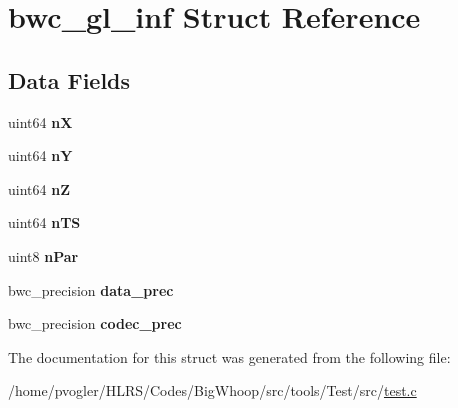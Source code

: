 \hypertarget{structbwc__gl__inf}{}\section{bwc\+\_\+gl\+\_\+inf Struct Reference}
\label{structbwc__gl__inf}
\subsection*{Data Fields}
\begin{DoxyCompactItemize}
\item 
\mbox{\label{structbwc__gl__inf_a4a150b866eb0e8f7c83122f0d42016b2}} 
uint64 {\bfseries nX}
\item 
\mbox{\label{structbwc__gl__inf_a81a18fc95c70815305bb4c5c172a5c8a}} 
uint64 {\bfseries nY}
\item 
\mbox{\label{structbwc__gl__inf_a84111fe3e428df8973fb648915f48936}} 
uint64 {\bfseries nZ}
\item 
\mbox{\label{structbwc__gl__inf_af1cfe5cba6335ac5b0b5a8a339529599}} 
uint64 {\bfseries n\+TS}
\item 
\mbox{\label{structbwc__gl__inf_a0756020367e6400b519d450b7d520c71}} 
uint8 {\bfseries n\+Par}
\item 
\mbox{\label{structbwc__gl__inf_a4bc61aed3c3bfeadaef3143c3227784e}} 
bwc\+\_\+precision {\bfseries data\+\_\+prec}
\item 
\mbox{\label{structbwc__gl__inf_ac2a0f3a187d0056a8746bb2c23c50afa}} 
bwc\+\_\+precision {\bfseries codec\+\_\+prec}
\end{DoxyCompactItemize}


The documentation for this struct was generated from the following file\+:\begin{DoxyCompactItemize}
\item 
/home/pvogler/\+H\+L\+R\+S/\+Codes/\+Big\+Whoop/src/tools/\+Test/src/\mbox{\hyperlink{test_8c}{test.\+c}}\end{DoxyCompactItemize}
